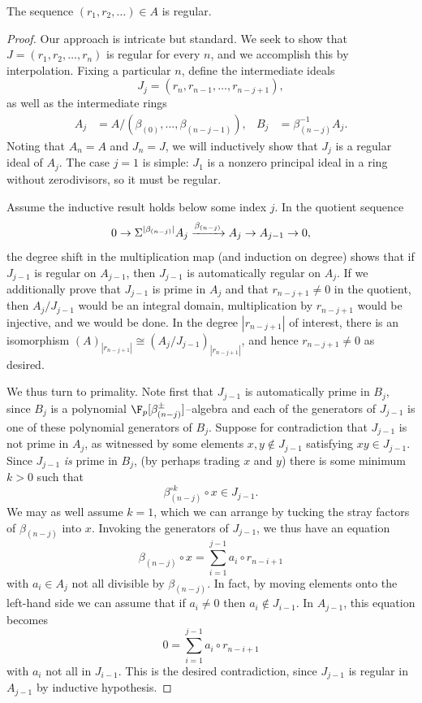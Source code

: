\begin{lemma}
The sequence \((r_1, r_2, \ldots) \in A\) is regular.
\end{lemma}
\begin{proof}
Our approach is intricate but standard.
We seek to show that \(J = (r_1, r_2, \ldots, r_n)\) is regular for every \(n\), and we accomplish this by interpolation.
Fixing a particular \(n\), define the intermediate ideals \[J_j = (r_n, r_{n-1}, \ldots, r_{n-j+1}),\] as well as the intermediate rings
\begin{align*}
A_j & = A / (\beta_{(0)}, \ldots, \beta_{(n-j-1)}), &
B_j & = \beta_{(n-j)}^{-1} A_j.
\end{align*}
Noting that \(A_n = A\) and \(J_n = J\), we will inductively show that \(J_j\) is a regular ideal of \(A_j\).
The case \(j = 1\) is simple: \(J_1\) is a nonzero principal ideal in a ring without zerodivisors, so it must be regular.

Assume the inductive result holds below some index \(j\).
In the quotient sequence \[0 \to \Sigma^{|\beta_{(n-j)}|} A_j \xrightarrow{\beta_{(n-j)}} A_j \to A_{j-1} \to 0,\] the degree shift in the multiplication map (and induction on degree) shows that if \(J_{j-1}\) is regular on \(A_{j-1}\), then \(J_{j-1}\) is automatically regular on \(A_j\).
If we additionally prove that \(J_{j-1}\) is prime in \(A_j\) and that \(r_{n-j+1} \ne 0\) in the quotient, then \(A_j / J_{j-1}\) would be an integral domain, multiplication by \(r_{n-j+1}\) would be injective, and we would be done.
In the degree \(|r_{n-j+1}|\) of interest, there is an isomorphism \((A)_{|r_{n-j+1}|} \cong (A_j / J_{j-1})_{|r_{n-j+1}|}\), and hence \(r_{n-j+1} \ne 0\) as desired.

We thus turn to primality.
Note first that \(J_{j-1}\) is automatically prime in \(B_j\), since \(B_j\) is a polynomial \(\F_p[\beta_{(n-j)}^\pm]\)--algebra and each of the generators of \(J_{j-1}\) is one of these polynomial generators of \(B_j\).
Suppose for contradiction that \(J_{j-1}\) is not prime in \(A_j\), as witnessed by some elements \(x, y \not\in J_{j-1}\) satisfying \(xy \in J_{j-1}\).
Since \(J_{j-1}\) \emph{is} prime in \(B_j\), (by perhaps trading \(x\) and \(y\)) there is some minimum \(k > 0\) such that \[\beta_{(n-j)}^{\circ k} \circ x \in J_{j-1}.\]
We may as well assume \(k = 1\), which we can arrange by tucking the stray factors of \(\beta_{(n-j)}\) into \(x\).
Invoking the generators of \(J_{j-1}\), we thus have an equation \[\beta_{(n-j)} \circ x = \sum_{i = 1}^{j-1} a_i \circ r_{n-i+1}\] with \(a_i \in A_j\) not all divisible by \(\beta_{(n-j)}\).
In fact, by moving elements onto the left-hand side we can assume that if \(a_i \ne 0\) then \(a_i \not\in J_{i-1}\).
In \(A_{j-1}\), this equation becomes \[0 = \sum_{i=1}^{j-1} a_i \circ r_{n-i+1}\] with \(a_i\) not all in \(J_{i-1}\).
This is the desired contradiction, since \(J_{j-1}\) is regular in \(A_{j-1}\) by inductive hypothesis.
\end{proof}

